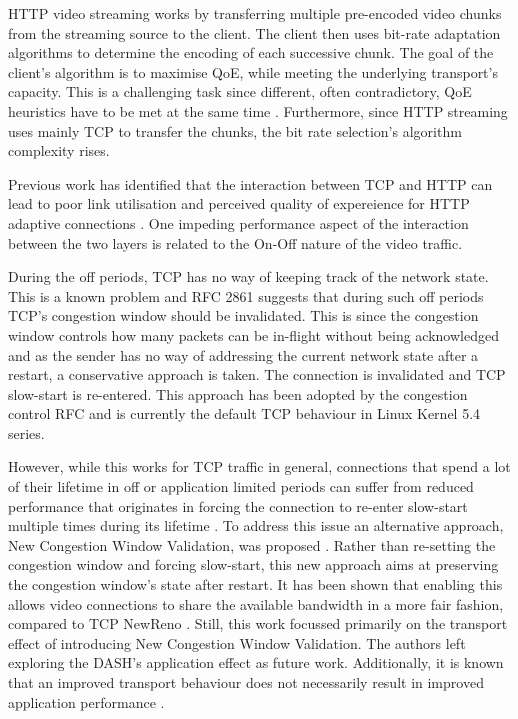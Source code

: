 \documentclass[10pt,sigconf]{acmart}
\begin{document}
HTTP video streaming works by transferring multiple pre-encoded video chunks from the streaming source to the client. The client then uses bit-rate adaptation algorithms to determine the encoding of each successive chunk. The goal of the client's algorithm is to maximise QoE, while meeting the underlying transport's capacity. This is a challenging task since different, often contradictory, QoE heuristics have to be met at the same time \cite{Seufert-2015-A-Survey-on-QoE-Dash}. Furthermore, since HTTP streaming uses mainly TCP to transfer the chunks, the bit rate selection's algorithm complexity rises.

Previous work has identified that the interaction between TCP and HTTP can lead to poor link utilisation and perceived quality of expereience for HTTP adaptive connections \cite{Bae-2015-why-is-http-streaming-hard,Esteban-2012-Interactions-HTTP-TCP}. One impeding performance aspect of the interaction between the two layers is related to the On-Off nature of the video traffic.

During the off periods, TCP has no way of keeping track of the network state. This is a known problem and RFC 2861 \cite{rfc2861-2000-padhye-congestion-window-validation} suggests that during such off periods TCP's congestion window should be invalidated. This is since the congestion window controls how many packets can be in-flight without being acknowledged and as the sender has no way of addressing the current network state after a restart, a conservative approach is taken. The connection is invalidated and TCP slow-start is re-entered. This approach has been adopted by the congestion control RFC \cite{rfc5681-congeston-control} and is currently the default TCP behaviour in Linux Kernel 5.4 series.

However, while this works for TCP traffic in general, connections that spend a lot of their lifetime in off or application limited periods can suffer from reduced performance that originates in forcing the connection to re-enter slow-start multiple times during its lifetime \cite{Esteban-2012-Interactions-HTTP-TCP}. To address this issue an alternative approach, New Congestion Window Validation, was proposed \cite{rfc7661-2015-fairhurst-new-cwnd-validation}. Rather than re-setting the congestion window and forcing slow-start, this new approach aims at preserving the congestion window's state after restart. It has been shown that enabling this allows video connections to share the available bandwidth in a more fair fashion, compared to TCP NewReno \cite{Nazir-2014-performance-evaluation-congestion-window-validation-dash-newcwv}. Still, this work focussed primarily on the transport effect of introducing New Congestion Window Validation. The authors left exploring the DASH's application effect as future work. Additionally, it is known that an improved transport behaviour does not necessarily result in improved application performance \cite{Spiteri-2016-BOLA}.
\end{document}
